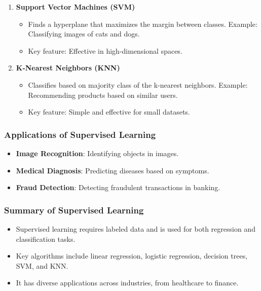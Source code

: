 \documentclass[aspectratio=169]{beamer}
\begin{document}
\begin{frame}[fragile]
\begin{enumerate}
        \item \textbf{Support Vector Machines (SVM)}
            \begin{itemize}
                \item Finds a hyperplane that maximizes the margin between classes. Example: Classifying images of cats and dogs.
                \item Key feature: Effective in high-dimensional spaces.
            \end{itemize}
        
        \item \textbf{K-Nearest Neighbors (KNN)}
            \begin{itemize}
                \item Classifies based on majority class of the k-nearest neighbors. Example: Recommending products based on similar users.
                \item Key feature: Simple and effective for small datasets.
            \end{itemize}
    \end{enumerate}
\end{frame}

\begin{frame}[fragile]
    \frametitle{Applications of Supervised Learning}
    \begin{itemize}
        \item \textbf{Image Recognition}: Identifying objects in images.
        \item \textbf{Medical Diagnosis}: Predicting diseases based on symptoms.
        \item \textbf{Fraud Detection}: Detecting fraudulent transactions in banking.
    \end{itemize}
\end{frame}

\begin{frame}[fragile]
    \frametitle{Summary of Supervised Learning}
    \begin{itemize}
        \item Supervised learning requires labeled data and is used for both regression and classification tasks.
        \item Key algorithms include linear regression, logistic regression, decision trees, SVM, and KNN.
        \item It has diverse applications across industries, from healthcare to finance.
    \end{itemize}
\end{frame}
\end{document}
